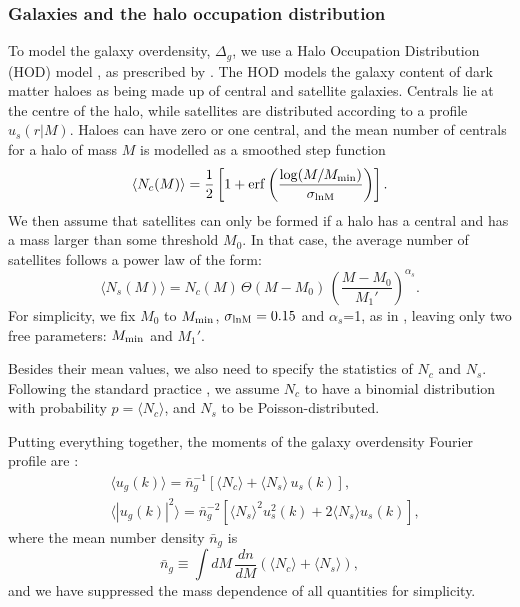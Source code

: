 \documentclass[useAMS,usenatbib]{mn2e}
\begin{document}
    \subsubsection{Galaxies and the halo occupation distribution}\label{sssec:theory.hm.hod}
      To model the galaxy overdensity, $\Delta_g$, we use a Halo Occupation Distribution (HOD) model \citep{2002ApJ...575..587B,2005ApJ...633..791Z,2013MNRAS.430..725V}, as prescribed by \cite{2011ApJ...736...59Z}. The HOD models the galaxy content of dark matter haloes as being made up of central and satellite galaxies. Centrals lie at the centre of the halo, while satellites are distributed according to a profile $u_s(r|M)$. Haloes can have zero or one central, and the mean number of centrals for a halo of mass $M$ is modelled as a smoothed step function
      \begin{equation}
        \langle N_c(M)\rangle=\frac{1}{2}\left[1+{\rm erf}\left(\frac{\log(M/M_{\rm min})}{\sigma_{\rm lnM}}\right)\right].
      \end{equation}
      We then assume that satellites can only be formed if a halo has a central and has a mass larger than some threshold $M_0$. In that case, the average number of satellites follows a power law of the form:
      \begin{equation}
        \langle N_s(M)\rangle=N_c(M)\,\Theta(M-M_0)\,\left(\frac{M-M_0}{M_1'}\right)^{\alpha_s}.
      \end{equation}
      For simplicity, we fix $M_0$ to $M_{\rm min}$, $\sigma_{\rm lnM}=0.15$ and $\alpha_s$=1, as in \cite{2018MNRAS.473.4318A}, leaving only two free parameters: $M_{\rm min}$ and $M_1'$.
      
      Besides their mean values, we also need to specify the statistics of $N_c$ and $N_s$. Following the standard practice \citep{2013MNRAS.430..725V}, we assume $N_c$ to have a binomial distribution with probability $p=\langle N_c\rangle$, and $N_s$ to be Poisson-distributed.

      Putting everything together, the moments of the galaxy overdensity Fourier profile are \citep[e.g. see section 2.2 of][]{2013MNRAS.430..725V}:
      \begin{align}
        &\langle u_g(k)\rangle=\bar{n}_g^{-1}\left[\langle N_c\rangle	+\langle N_s\rangle\,u_s(k)\right],\\
        &\langle |u_g(k)|^2\rangle=\bar{n}_g^{-2}\left[\langle N_s\rangle^2u_s^2(k)+2\langle N_s\rangle u_s(k)\right],
      \end{align}
      where the mean number density $\bar{n}_g$ is
      \begin{equation}
        \bar{n}_g\equiv\int dM\,\frac{dn}{dM}\left(\langle N_c\rangle+\langle N_s\rangle\right),
      \end{equation} 
      and we have suppressed the mass dependence of all quantities for simplicity.
\end{document}
